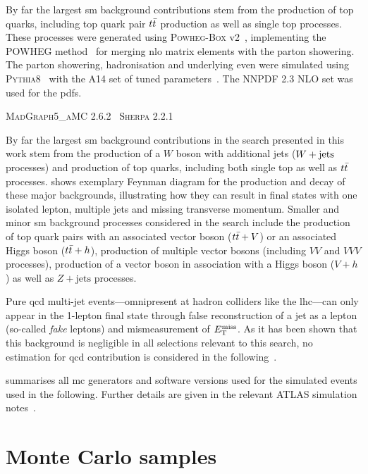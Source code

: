 By far the largest \gls{sm} background contributions stem from the production of top quarks, including top quark pair $t\bar{t}$ production as well as single top processes. These processes were generated using \textsc{Powheg-Box} v2~\cite{PowhegBox:2010xd}, implementing the \textsc{POWHEG} method~\cite{Powheg1,Powheg2} for merging \gls{nlo} matrix elements with the parton showering. The parton showering, hadronisation and underlying even were simulated using \textsc{Pythia8}~\cite{Pythia8:2007gs} with the A14 set of tuned parameters~\cite{ATL-PHYS-PUB-2014-021}. The NNPDF 2.3 NLO set was used for the \glspl{pdf}.

\textsc{MadGraph5\_aMC\@NLO} 2.6.2~\cite{MGaMCNLO:2014hca,Frederix:2012ps}
\textsc{Sherpa} 2.2.1

By far the largest \gls{sm} background contributions in the search presented in this work stem from the production of a $W$ boson with additional jets ($W+\mathrm{jets}$ processes) and production of top quarks, including both single top as well as $t\bar{t}$ processes.  shows exemplary Feynman diagram for the production and decay of these major backgrounds, illustrating how they can result in final states with one isolated lepton, multiple jets and missing transverse momentum. Smaller and minor \gls{sm} background processes considered in the search include the production of top quark pairs with an associated vector boson ($t\bar{t} + V$) or an associated Higgs boson ($t\bar{t} + h$), production of multiple vector bosons (including $VV$ and $VVV$ processes), production of a vector boson in association with a Higgs boson ($V+h$) as well as $Z+\mathrm{jets}$ processes.

Pure \gls{qcd} multi-jet events---omnipresent at hadron colliders like the \gls{lhc}---can only appear in the 1-lepton final state through false reconstruction of a jet as a lepton (so-called \textit{fake} leptons) and mismeasurement of $E_{\textrm{T}}^{\textrm{miss}}$. As it has been shown that this background is negligible in all selections relevant to this search, no estimation for \gls{qcd} contribution is considered in the following~\cite{SUSY-2019-08}.

 summarises all \gls{mc} generators and software versions used for the simulated events used in the following. Further details are given in the relevant ATLAS simulation notes~\cite{ATL-PHYS-PUB-2018-009,ATL-PHYS-PUB-2016-005,ATL-PHYS-PUB-2017-006,ATL-PHYS-PUB-2017-005,ATL-PHYS-PUB-2016-005,ATL-PHYS-PUB-2016-002}.

\section{Monte Carlo samples}

